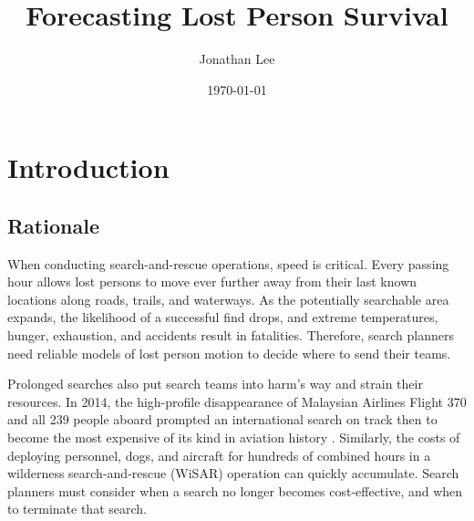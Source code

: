 \documentclass[12pt,titlepage]{article}
\begin{document}
  \title{Forecasting Lost Person Survival}
  \author{Jonathan Lee}
  \date{\today}
  \maketitle


  \section{Introduction}
    \subsection{Rationale}
      When conducting search-and-rescue operations, speed is critical. Every
      passing hour allows lost persons to move ever further away from their
      last known locations along roads, trails, and waterways. As the
      potentially searchable area expands, the likelihood of a successful find
      drops, and extreme temperatures, hunger, exhaustion, and accidents result
      in fatalities. Therefore, search planners need reliable models of lost
      person motion to decide where to send their teams.

      Prolonged searches also put search teams into harm's way and strain their
      resources. In 2014, the high-profile disappearance of Malaysian Airlines
      Flight 370 and all 239 people aboard prompted an international search on
      track then to become the most expensive of its kind in aviation history
      \cite{semple}. Similarly, the costs of deploying personnel, dogs, and
      aircraft for hundreds of combined hours in a wilderness search-and-rescue
      (WiSAR) operation can quickly accumulate. Search planners must consider
      when a search no longer becomes cost-effective, and when to terminate
      that search.
\end{document}
